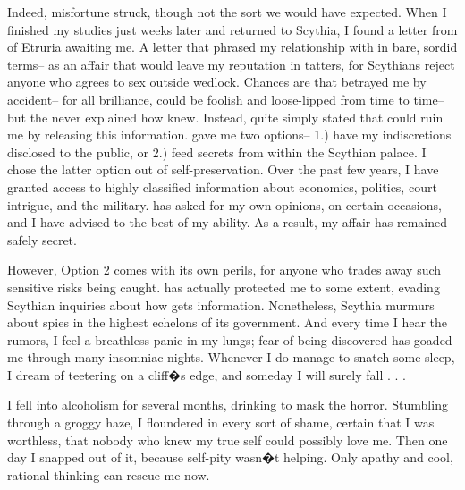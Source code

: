 \documentclass[char]{Kos}
\begin{document}
Indeed, misfortune struck, though not the sort we would have expected. When I finished my studies just weeks later and returned to Scythia, I found a letter from \cEtruriaKing{\Monarch} \cEtruriaKing{\nickname} of Etruria awaiting me. A letter that phrased my relationship with \cPoet{\nickname} in bare, sordid terms-- as an affair that would leave my reputation in tatters, for Scythians reject anyone who agrees to sex outside wedlock. Chances are that \cPoet{\nickname} betrayed me by accident-- for all \cPoet{\their} brilliance, \cPoet{\they} could be foolish and loose-lipped from time to time-- but the \cEtruriaKing{\monarch} never explained how \cEtruriaKing{\they} knew. Instead, \cEtruriaKing{\they} quite simply stated that \cEtruriaKing{\they} could ruin me by releasing this information. \cEtruriaKing{\They} gave me two options-- 1.) have my indiscretions disclosed to the public, or 2.) feed \cEtruriaKing{\them} secrets from within the Scythian palace. I chose the latter option out of self-preservation. Over the past few years, I have granted \cEtruriaKing{\them} access to highly classified information about economics, politics, court intrigue, and the military. \cEtruriaKing{\They} has asked for my own opinions, on certain occasions, and I have advised \cEtruriaKing{\them} to the best of my ability. As a result, my affair has remained safely secret. 

However, Option 2 comes with its own perils, for anyone who trades away such sensitive risks being caught. \cEtruriaKing{}  has actually protected me to some extent, evading Scythian inquiries about how \cEtruriaKing{\they} gets \cEtruriaKing{\their} information. Nonetheless, Scythia murmurs about spies in the highest echelons of its government. And every time I hear the rumors, I feel a breathless panic in my lungs; fear of being discovered has goaded me through many insomniac nights. Whenever I do manage to snatch some sleep, I dream of teetering on a cliff�s edge, and someday I will surely fall . . .

I fell into alcoholism for several months, drinking to mask the horror. Stumbling through a groggy haze, I floundered in every sort of shame, certain that I was worthless, that nobody who knew my true self could possibly love me. Then one day I snapped out of it, because self-pity wasn�t helping. Only apathy and cool, rational thinking can rescue me now.
\end{document}
